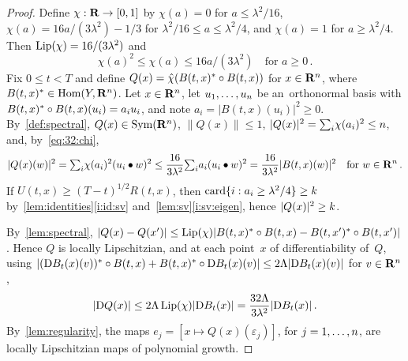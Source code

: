 \documentclass[a4paper,twoside,leqno]{article}
\begin{document}
\begin{proof}
    Define $\chi : \mathbf{R} \to [0,1]$ by $\chi(a) = 0$ for $a \le \lambda^2/16$, $\chi(a) = 16 a /
    (3 \lambda^2) - 1/3$ for $\lambda^2/16 \le a \le \lambda^2/4$, and $\chi(a) = 1$ for $a \ge
    \lambda^2/4$. Then $\operatorname{Lip}(\chi) = 16/(3 \lambda^2)$ and
    \begin{equation}
        \label{eq:32:chi}
        \chi(a)^2 \le \chi(a) \le 16 a / (3 \lambda^2) \quad \text{for $a \ge 0$} \,.
    \end{equation}
    Fix $0 \le t < T$ and define $Q(x) = \hat\chi(B(t,x)^{*} \circ B(t,x))$ for $x \in
    \mathbf{R}^{n}$, where $B(t,x)^{*} \in \operatorname{Hom}(Y,\mathbf{R}^{n})$. Let $x \in \mathbf{R}^{n}$, let
    $u_1, \ldots, u_{n}$ be an~orthonormal basis with $B(t,x)^{*} \circ B(t,x)(u_i) =
    a_i u_i$, and note $a_i = |B(t,x)(u_i)|^2 \ge 0$. By~\ref{def:spectral}, $Q(x) \in
    \mathrm{Sym}({\mathbf{R}^{n}})$, $\|Q(x)\| \le 1$, $|Q(x)|^2 = {\textstyle\sum_{i}^{}} \chi(a_i)^2 \le n$, and,
    by~\eqref{eq:32:chi},
    \begin{equation}
        \label{eq:32:QB}
        |Q(x)(w)|^2 = {\textstyle\sum_{i}^{}} \chi(a_i)^2 (u_i \bullet w)^2 \le \frac{16}{3 \lambda^2}
        {\textstyle\sum_{i}^{}} a_i (u_i \bullet w)^2 = \frac{16}{3 \lambda^2} |B(t,x)(w)|^2
        \quad \text{for $w \in \mathbf{R}^{n}$} \,.
    \end{equation}
    If $U(t,x) \ge (T-t)^{1/2} R(t,x)$, then $\operatorname{card} \{ i : a_i \ge \lambda^2/4 \} \ge k$
    by~\ref{lem:identities}\ref{i:id:sv} and~\ref{lem:sv}\ref{i:sv:eigen}, hence $|Q(x)|^2 \ge
    k$.

    By~\ref{lem:spectral}, $|Q(x) - Q(x')| \le \operatorname{Lip}(\chi) |B(t,x)^{*} \circ B(t,x) -
    B(t,x')^{*} \circ B(t,x')|$. Hence $Q$ is locally Lipschitzian, and at each point~$x$
    of differentiability of~$Q$, using $|(\mathrm{D} B_t(x)(v))^{*} \circ B(t,x) +
    B(t,x)^{*} \circ \mathrm{D} B_t(x)(v)| \le 2 \Lambda |\mathrm{D} B_t(x)(v)|$ for $v \in \mathbf{R}^{n}$,
    \begin{equation}
        \label{eq:32:DQ}
        |\mathrm{D} Q(x)| \le 2 \Lambda \operatorname{Lip}(\chi) |\mathrm{D} B_t(x)| = \frac{32 \Lambda}{3 \lambda^2} |\mathrm{D}
        B_t(x)| \,.
    \end{equation}
    By~\ref{lem:regularity}, the maps $e_j = [x \mapsto Q(x)(\varepsilon_j)]$, for $j = 1, \ldots,
    n$, are locally Lipschitzian maps of polynomial growth.


\end{proof}
\end{document}
